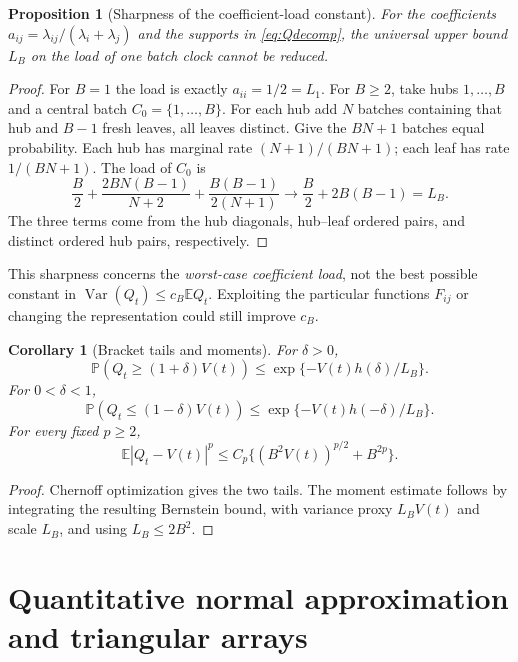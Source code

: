 \documentclass[11pt]{article}
\numberwithin{equation}{section}
\newtheorem{proposition}[theorem]{Proposition}
\newtheorem{corollary}[theorem]{Corollary}
\theoremstyle{definition}
\theoremstyle{remark}
\newcommand{\E}{\mathbb E}
\newcommand{\Pp}{\mathbb P}
\newcommand{\Var}{\operatorname{Var}}
\begin{document}
\begin{proposition}[Sharpness of the coefficient-load constant]\label{prop:loadsharp}
For the coefficients $a_{ij}=\lambda_{ij}/(\lambda_i+\lambda_j)$ and the
supports in \eqref{eq:Qdecomp}, the universal upper bound $L_B$ on the load
of one batch clock cannot be reduced.
\end{proposition}
\begin{proof}
For $B=1$ the load is exactly $a_{ii}=1/2=L_1$. For $B\ge2$, take hubs
$1,\ldots,B$ and a central batch $C_0=\{1,\ldots,B\}$. For each hub add
$N$ batches containing that hub and $B-1$ fresh leaves, all leaves distinct.
Give the $BN+1$ batches equal probability. Each hub has marginal rate
$(N+1)/(BN+1)$; each leaf has rate $1/(BN+1)$. The load of $C_0$ is
\[
 \frac B2+\frac{2BN(B-1)}{N+2}
             +\frac{B(B-1)}{2(N+1)}
 \longrightarrow \frac B2+2B(B-1)=L_B.
\]
The three terms come from the hub diagonals, hub--leaf ordered pairs, and
distinct ordered hub pairs, respectively.
\end{proof}

This sharpness concerns the \emph{worst-case coefficient load}, not the best
possible constant in $\Var(Q_t)\le c_B\E Q_t$. Exploiting the particular
functions $F_{ij}$ or changing the representation could still improve $c_B$.

\begin{corollary}[Bracket tails and moments]\label{cor:brackettails}
For $\delta>0$,
\begin{equation}\label{eq:Qupper}
 \Pp(Q_t\ge(1+\delta)V(t))
 \le\exp\{-V(t)h(\delta)/L_B\}.
\end{equation}
For $0<\delta<1$,
\begin{equation}\label{eq:Qlower}
 \Pp(Q_t\le(1-\delta)V(t))
 \le\exp\{-V(t)h(-\delta)/L_B\}.
\end{equation}
For every fixed $p\ge2$,
\begin{equation}\label{eq:Qmoments}
 \E|Q_t-V(t)|^p
 \le C_p\{(B^2V(t))^{p/2}+B^{2p}\}.
\end{equation}
\end{corollary}
\begin{proof}
Chernoff optimization gives the two tails. The moment estimate follows by
integrating the resulting Bernstein bound, with variance proxy $L_BV(t)$ and
scale $L_B$, and using $L_B\le2B^2$.
\end{proof}

\section{Quantitative normal approximation and triangular arrays}\label{sec:normal}
\end{document}
